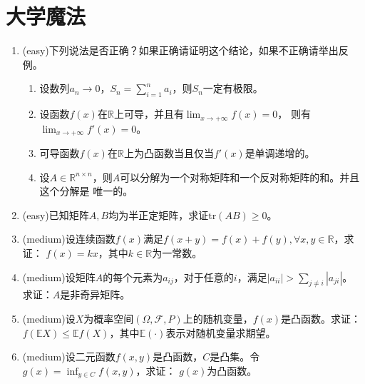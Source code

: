 \documentclass[a4paper]{article}
\begin{document}
\section{大学魔法}
\begin{enumerate}
\item (easy)下列说法是否正确？如果正确请证明这个结论，如果不正确请举出反例。
	\begin{enumerate}
	\item 设数列$a_n\rightarrow 0$，$S_n=\sum_{i=1}^{n}a_i$，则$S_n$一定有极限。
	\item 设函数$f(x)$在$\mathbb{R}$上可导，并且有$\lim_{x\rightarrow +\infty}f(x)=0$，
	则有$\lim_{x\rightarrow +\infty}f'(x)=0$。
	\item 可导函数$f(x)$在$\mathbb{R}$上为凸函数当且仅当$f'(x)$是单调递增的。
	\item 设$A\in \mathbb{R}^{n\times n}$，则$A$可以分解为一个对称矩阵和一个反对称矩阵的和。并且这个分解是
	唯一的。
	\end{enumerate}
\item (easy)已知矩阵$A,B$均为半正定矩阵，求证$\mathrm{tr}(AB)\geqslant0$。
\item (medium)设连续函数$f(x)$满足$f(x+y)=f(x)+f(y),\forall x,y \in \mathbb{R}$，求证：
$f(x)=kx$，其中$k\in \mathbb{R}$为一常数。
\item (medium)设矩阵$A$的每个元素为$a_{ij}$，对于任意的$i$，满足$|a_{ii}|>\sum_{j\neq i}{|a_{ji}|}$。
求证：$A$是非奇异矩阵。
\item (medium)设$X$为概率空间$(\Omega,\mathcal{F},P)$上的随机变量，$f(x)$是凸函数。求证：
$f(\mathbb{E}X)\leqslant \mathbb{E}f(X)$，其中$\mathbb{E}(\cdot)$表示对随机变量求期望。
\item (medium)设二元函数$f(x,y)$是凸函数，$C$是凸集。令$g(x)=\inf_{y\in C}f(x,y)$，求证：
$g(x)$为凸函数。
\end{enumerate}
\end{document}
